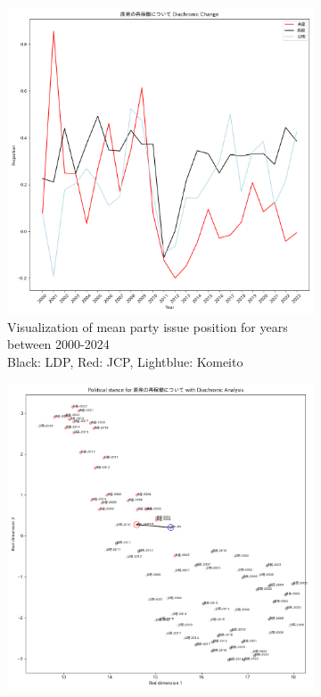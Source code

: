 \documentclass[final,5p,times,twocolumn,authoryear]{elsarticle}
\begin{document}
\begin{figure}[h]
	\centering
		\begin{subfigure}{0.48\textwidth}
		  \centering
		  \includegraphics[width=\textwidth]{figs/results/diachronic_nuclear/原発の再稼働について_原発_diachronic_change.png}
		  \caption{Visualization of mean party issue position for years between 2000-2024 \\\hspace{\textwidth}  Black: LDP, Red: JCP, Lightblue: Komeito}
		  \label{fig:sub1}
		\end{subfigure}
		\hfill
		\begin{subfigure}{0.48\textwidth}
		  \centering
		  \includegraphics[width=\textwidth]{figs/results/diachronic_nuclear/原発の再稼働について_diachronic_umap.png}

\end{subfigure}
\end{figure}
\end{document}

